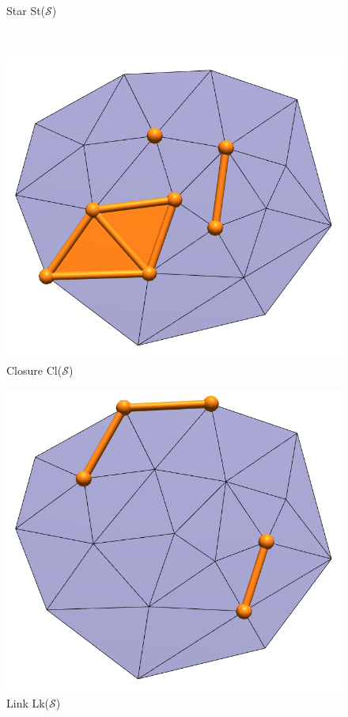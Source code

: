 \documentclass{article}
\begin{document}
\begin{table}[ht]
\begin{subfigure}{0.45\columnwidth}
    \caption{Star St($\mathcal{S}$)}
    \end{subfigure}\\[1em]
    \begin{subfigure}{0.45\columnwidth}
    \includegraphics[width=\linewidth]{figs/2_8_closure.png}
    \caption{Closure Cl($\mathcal{S}$)}
    \end{subfigure}\hfill
    \begin{subfigure}{0.45\columnwidth}
    \includegraphics[width=\linewidth]{figs/2_8_link.png} 
    \caption{Link Lk($\mathcal{S}$)}
    \end{subfigure}
\end{table}%
\end{document}
